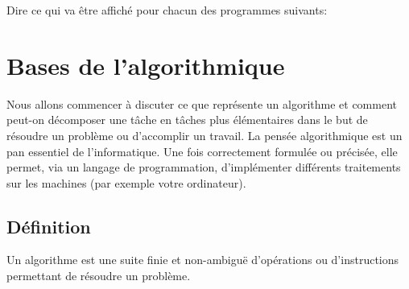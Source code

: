 \documentclass[11pt, a4paper]{book}
\begin{document}

\begin{exercice}
Dire ce qui va être affiché pour chacun des programmes suivants:
\end{exercice}


\section{Bases de l'algorithmique}

Nous allons commencer à discuter ce que représente un algorithme et comment peut-on décomposer une tâche en tâches plus élémentaires dans le but de résoudre un problème ou d'accomplir un travail. La pensée algorithmique est un pan essentiel de l'informatique. Une fois correctement formulée ou précisée, elle permet, via un langage de programmation, d'implémenter différents traitements sur les machines (par exemple votre ordinateur).


\subsection{Définition}
\begin{defi}
Un algorithme est une suite finie et non-ambiguë d'opérations ou d'instructions permettant de résoudre un problème.

\end{defi}
\end{document}
